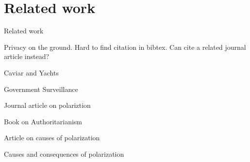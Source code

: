 
\section{Related work}
\label{sec:related}

Related work

Privacy on the ground. Hard to find citation in bibtex. Can cite a related journal article instead?

Caviar and Yachts \cite{johnsoncaviar}

Government Surveillance \cite{laskowskigovernment}

Journal article on polariztion \cite{poole1984polarization}

Book on Authoritarianism \cite{hetherington2009authoritarianism}

Article on causes of polarization \cite{layman2006party}

Causes and consequences of polarization \cite{barber2015causes}
